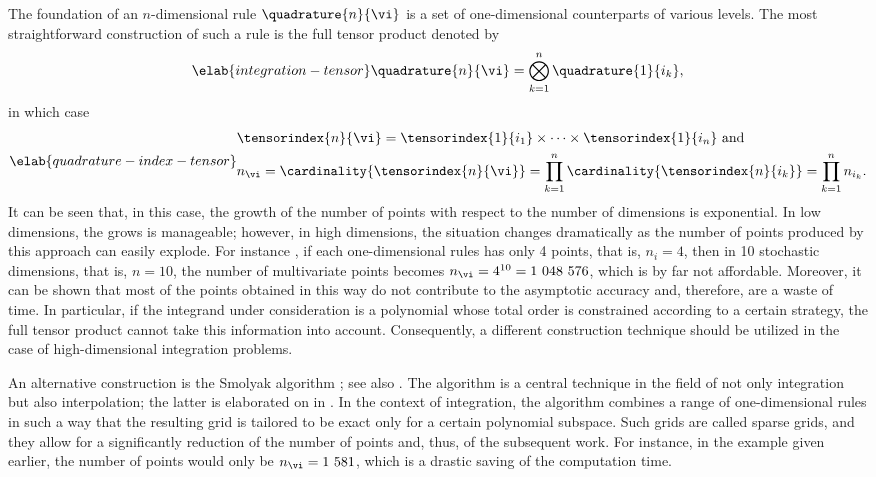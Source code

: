 The foundation of an $n$-dimensional rule $\quadrature{n}{\vi}$ is a set of
one-dimensional counterparts of various levels. The most straightforward
construction of such a rule is the full tensor product denoted by
\begin{equation} \elab{integration-tensor}
  \quadrature{n}{\vi} = \bigotimes_{k = 1}^n \quadrature{1}{i_k},
\end{equation}
in which case
\begin{equation} \elab{quadrature-index-tensor}
  \begin{split}
    & \tensorindex{n}{\vi}
    = \tensorindex{1}{i_1} \times \cdots \times \tensorindex{1}{i_n} \text{ and} \\
    & n_{\vi}
    = \cardinality{\tensorindex{n}{\vi}}
    = \prod_{k = 1}^n \cardinality{\tensorindex{n}{i_k}}
    = \prod_{k = 1}^n n_{i_k}.
  \end{split}
\end{equation}
It can be seen that, in this case, the growth of the number of points with
respect to the number of dimensions is exponential. In low dimensions, the grows
is manageable; however, in high dimensions, the situation changes dramatically
as the number of points produced by this approach can easily explode. For
instance \cite{heiss2008}, if each one-dimensional rules has only 4 points, that
is, $n_i = 4$, then in 10 stochastic dimensions, that is, $n = 10$, the number
of multivariate points becomes $n_{\vi} = 4^{10} = 1~048~576$, which is by far
not affordable. Moreover, it can be shown that most of the points obtained in
this way do not contribute to the asymptotic accuracy and, therefore, are a
waste of time. In particular, if the integrand under consideration is a
polynomial whose total order is constrained according to a certain strategy, the
full tensor product cannot take this information into account. Consequently, a
different construction technique should be utilized in the case of
high-dimensional integration problems.

An alternative construction is the Smolyak algorithm \cite{smolyak1963}; see
also \cite{klimke2006, eldred2008, heiss2008, maitre2010}. The algorithm is a
central technique in the field of not only integration but also interpolation;
the latter is elaborated on in . In the context of
integration, the algorithm combines a range of one-dimensional rules in such a
way that the resulting grid is tailored to be exact only for a certain
polynomial subspace. Such grids are called sparse grids, and they allow for a
significantly reduction of the number of points and, thus, of the subsequent
work. For instance, in the example given earlier, the number of points would
only be $n_{\vi} = 1~581$, which is a drastic saving of the computation time.

